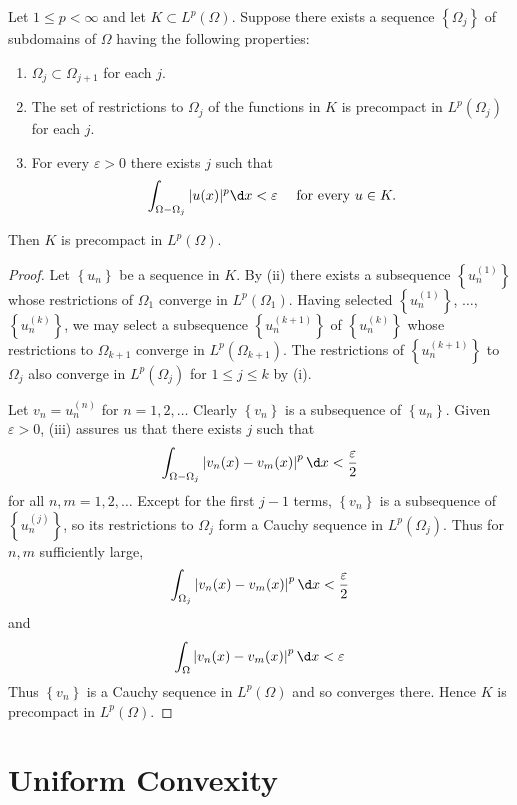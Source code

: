 \begin{theorem}
  Let $1 \leq p<\infty$ and let $K \subset L^p(\Omega)$. Suppose there exists a sequence $\left\{\Omega_j\right\}$ of subdomains of $\Omega$ having the following properties:
  \begin{enumerate}[label = (\roman*)]
    \item $\Omega_j \subset \Omega_{j+1}$ for each $j$.
    \item The set of restrictions to $\Omega_j$ of the functions in $K$ is precompact in $L^p\left(\Omega_j\right)$ for each $j$.
    \item For every $\varepsilon>0$ there exists $j$ such that
    \[
    \int_{\Omega-\Omega_j}|u(x)|^p \d x<\varepsilon \quad \text { for every } u \in K.
    \]
  \end{enumerate}
  Then $K$ is precompact in $L^p(\Omega)$.
\end{theorem}

\begin{proof}
  Let $\left\{u_n\right\}$ be a sequence in $K$.
  By (ii) there exists a subsequence $\left\{u_n^{(1)}\right\}$ whose restrictions
  of $\Omega_1$ converge in $L^p\left(\Omega_1\right)$.
  Having selected $\left\{u_n^{(1)}\right\}$, $\ldots$, $\left\{u_n^{(k)}\right\}$,
  we may select a subsequence $\left\{u_n^{(k+1)}\right\}$ of $\left\{u_n^{(k)}\right\}$
  whose restrictions to $\Omega_{k+1}$ converge in $L^p\left(\Omega_{k+1}\right)$.
  The restrictions of $\left\{u_n^{(k+1)}\right\}$ to $\Omega_j$ also converge
  in $L^p\left(\Omega_j\right)$ for $1 \leq j \leq k$ by (i).
  
  Let $v_n=u_n^{(n)}$ for $n=1,2, \ldots$ Clearly $\left\{v_n\right\}$ is a subsequence
  of $\left\{u_n\right\}$. Given $\varepsilon>0$, (iii) assures us that there exists $j$ such that
  \[
  \int_{\Omega-\Omega_j}\left|v_n(x)-v_m(x)\right|^p \d x<\frac{\varepsilon}{2}
  \]
  for all $n, m=1,2, \ldots$ Except for the first $j-1$ terms, $\left\{v_n\right\}$
  is a subsequence of $\left\{u_n^{(j)}\right\}$, so its restrictions to $\Omega_j$
  form a Cauchy sequence in $L^p\left(\Omega_j\right)$. Thus for $n, m$ sufficiently large,
  \[
  \int_{\Omega_j}\left|v_n(x)-v_m(x)\right|^p \d x<\frac{\varepsilon}{2}
  \]
  and
  \[
  \int_{\Omega}\left|v_n(x)-v_m(x)\right|^p \d x<\varepsilon
  \]
  Thus $\left\{v_n\right\}$ is a Cauchy sequence in $L^p(\Omega)$ and so converges there.
  Hence $K$ is precompact in $L^p(\Omega)$.
\end{proof}


\section{Uniform Convexity}

